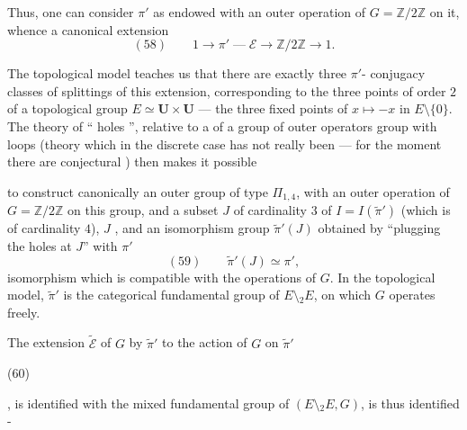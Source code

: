 Thus, one can consider $\pi'$ as endowed 
with an  outer operation of
$G=\mathbb Z/2\mathbb Z$ on it, whence a
canonical extension
\[
(58)\qquad 1\longrightarrow\pi'\mathrel{\text{---}}\mathcal E\longrightarrow\mathbb Z/2\mathbb Z\longrightarrow1.
\]

The topological model teaches us
that there are exactly three $\pi'$-
conjugacy classes of splittings of this
extension, corresponding to the three
points of order $2$ of a topological group
$E\simeq\mathbf U\times\mathbf U$ --- the three fixed points of
$x\mapsto-x$ in $E\setminus\{0\}$. The theory of
`` holes '', relative to a
 of a  group of outer operators
 group with loops (theory which
 in the discrete case has not really
been  --- for the moment there are
conjectural ) then makes it possible


to construct canonically an outer group  of type $\Pi_{1,4}$, with an outer operation of $G=\mathbb Z/2\mathbb Z$ on this group, and a subset $J$  of cardinality $3$ of $I=I(\widetilde{\pi}')$ (which is of cardinality $4$), $J$ , and an isomorphism  group $\widetilde{\pi}'(J)$  obtained by ``plugging the holes at $J$'' with $\pi'$
\[
(59)\qquad \widetilde{\pi}'(J)\simeq\pi',
\]
isomorphism which is compatible with the operations of $G$. In the topological model, $\widetilde{\pi}'$ is the categorical fundamental group of  $E\setminus {}_2E$,  on which $G$ operates freely.


The extension $\widetilde{\mathcal E}$ of $G$ by $\widetilde{\pi}'$  to the action of  $G$ on $\widetilde{\pi}'$
\begin{samepage}
\noindent (60)\quad
{}
\end{samepage},
 is identified  with the mixed fundamental group of $(E\setminus {}_2E,G)$, is thus identified -

